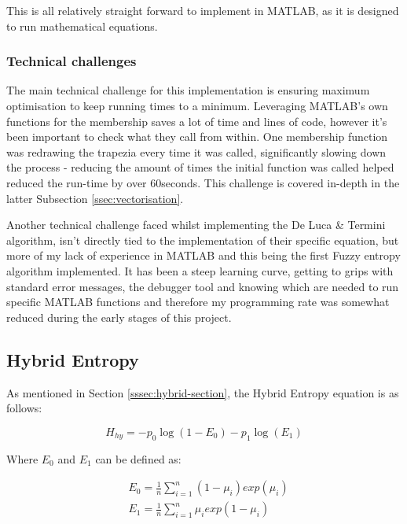 This is all relatively straight forward to implement in MATLAB, as it is designed to run mathematical equations.


\subsubsection{Technical challenges}

The main technical challenge for this implementation is ensuring maximum optimisation to keep running times to a minimum. Leveraging MATLAB's own functions for the membership saves a lot of time and lines of code, however it's been important to check what they call from within. One membership function was redrawing the trapezia every time it was called, significantly slowing down the process - reducing the amount of times the initial function was called helped reduced the run-time by over 60seconds. This challenge is covered in-depth in the latter Subsection \ref{ssec:vectorisation}.

Another technical challenge faced whilst implementing the De Luca \& Termini algorithm, isn't directly tied to the implementation of their specific equation, but more of my lack of experience in MATLAB and this being the first Fuzzy entropy algorithm implemented. It has been a steep learning curve, getting to grips with standard error messages, the debugger tool and knowing which  are needed to run specific MATLAB functions and therefore my programming rate was somewhat reduced during the early stages of this project.

\subsection{Hybrid Entropy}
\label{ssec:hybrid-sec}

As mentioned in Section \ref{sssec:hybrid-section}, the Hybrid Entropy equation is as follows:

\begin{equation}
  H_{hy} = -p_0\log(1 - E_0) - p_1\log(E_1)
\end{equation}

Where $E_0$ and $E_1$ can be defined as:

\begin{subequations} %
  \begin{align}
    &E_0 = \frac{1}{n}\displaystyle\sum_{i=1}^{n}{(1-\mu_i)exp(\mu_i)} \\
    &E_1 = \frac{1}{n}\displaystyle\sum_{i=1}^{n}{\mu_iexp(1-\mu_i)}
  \end{align}
\end{subequations}

